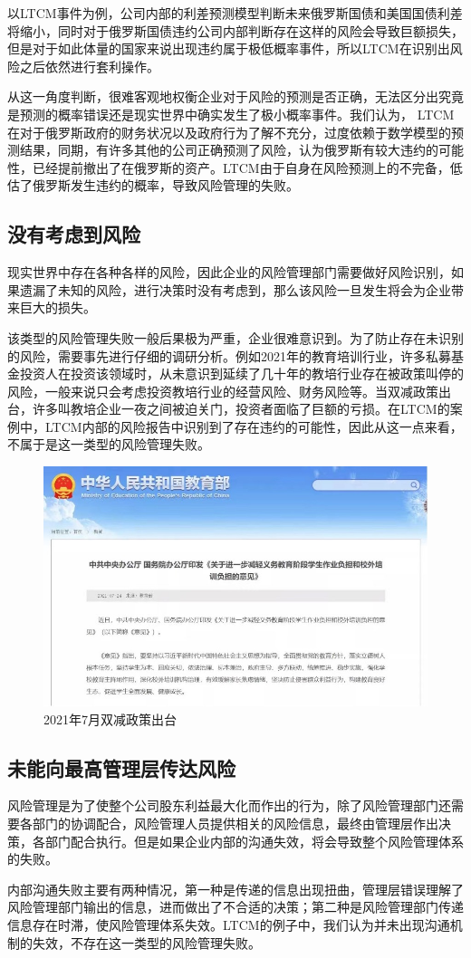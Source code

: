 以LTCM事件为例，公司内部的利差预测模型判断未来俄罗斯国债和美国国债利差将缩小，同时对于俄罗斯国债违约公司内部判断存在这样的风险会导致巨额损失，但是对于如此体量的国家来说出现违约属于极低概率事件，所以LTCM在识别出风险之后依然进行套利操作。

从这一角度判断，很难客观地权衡企业对于风险的预测是否正确，无法区分出究竟是预测的概率错误还是现实世界中确实发生了极小概率事件。我们认为， LTCM在对于俄罗斯政府的财务状况以及政府行为了解不充分，过度依赖于数学模型的预测结果，同期，有许多其他的公司正确预测了风险，认为俄罗斯有较大违约的可能性，已经提前撤出了在俄罗斯的资产。LTCM由于自身在风险预测上的不完备，低估了俄罗斯发生违约的概率，导致风险管理的失败。

\subsection{没有考虑到风险}\label{sec:2}
现实世界中存在各种各样的风险，因此企业的风险管理部门需要做好风险识别，如果遗漏了未知的风险，进行决策时没有考虑到，那么该风险一旦发生将会为企业带来巨大的损失。

该类型的风险管理失败一般后果极为严重，企业很难意识到。为了防止存在未识别的风险，需要事先进行仔细的调研分析。例如2021年的教育培训行业，许多私募基金投资人在投资该领域时，从未意识到延续了几十年的教培行业存在被政策叫停的风险，一般来说只会考虑投资教培行业的经营风险、财务风险等。当双减政策出台，许多叫教培企业一夜之间被迫关门，投资者面临了巨额的亏损。在LTCM的案例中，LTCM内部的风险报告中识别到了存在违约的可能性，因此从这一点来看，不属于是这一类型的风险管理失败。
\begin{figure}[H]
    \centering
    \includegraphics[width=\linewidth]{img/图片 1.jpg}
    \caption{2021年7月双减政策出台}
\end{figure}
\subsection{未能向最高管理层传达风险}\label{sec:3}
风险管理是为了使整个公司股东利益最大化而作出的行为，除了风险管理部门还需要各部门的协调配合，风险管理人员提供相关的风险信息，最终由管理层作出决策，各部门配合执行。但是如果企业内部的沟通失效，将会导致整个风险管理体系的失败。

内部沟通失败主要有两种情况，第一种是传递的信息出现扭曲，管理层错误理解了风险管理部门输出的信息，进而做出了不合适的决策；第二种是风险管理部门传递信息存在时滞，使风险管理体系失效。LTCM的例子中，我们认为并未出现沟通机制的失效，不存在这一类型的风险管理失败。
